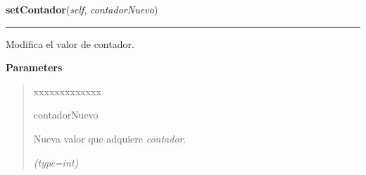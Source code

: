     \label{grafo:Grafo:setContador}

    \vspace{0.5ex}

\hspace{.8\funcindent}\begin{boxedminipage}{\funcwidth}

    \raggedright \textbf{setContador}(\textit{self}, \textit{contadorNuevo})

    \vspace{-1.5ex}

    \rule{\textwidth}{0.5\fboxrule}
\setlength{\parskip}{2ex}
    Modifica el valor de contador.

\setlength{\parskip}{1ex}
      \textbf{Parameters}
      \vspace{-1ex}

      \begin{quote}
        \begin{Ventry}{xxxxxxxxxxxxx}

          \item[contadorNuevo]

          Nueva valor que adquiere \textit{contador}.

            {\it (type=int)}

        \end{Ventry}

      \end{quote}

    \end{boxedminipage}

    \label{grafo:Grafo:leerDocumentoTodasCategorias}

    \vspace{0.5ex}

